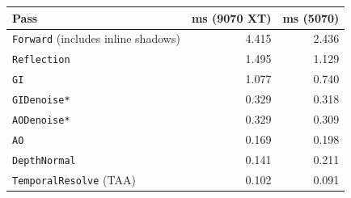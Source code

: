 \begin{tabular}{lrr}
\toprule
Pass & ms (9070 XT) & ms (5070) \\
\midrule
\texttt{Forward} (includes inline shadows) & 4.415 & 2.436 \\
\texttt{Reflection} & 1.495 & 1.129 \\
\texttt{GI} & 1.077 & 0.740 \\
\texttt{GIDenoise*} & 0.329 & 0.318 \\
\texttt{AODenoise*} & 0.329 & 0.309 \\
\texttt{AO} & 0.169 & 0.198 \\
\texttt{DepthNormal} & 0.141 & 0.211 \\
\texttt{TemporalResolve} (TAA) & 0.102 & 0.091 \\
\bottomrule
\end{tabular}
